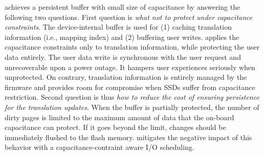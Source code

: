 \iffalse
\ours{} achieves a persistent buffer with small size of capacitance by answering the following two questions. 
First question is \textit{what not to protect under capacitance constraints}. The device-internal buffer is used for (1) caching translation information (i.e., mapping index) and (2) buffering user writes. 
\ours{} applies the capacitance constraints only to translation information, while protecting the user data entirely. The user data write is synchronous with the user request and unrecoverable upon a power outage. It hampers user experiences seriously when unprotected. On contrary, 
translation information is entirely managed by the firmware and provides room for compromise when SSDs suffer from capacitance restriction.  
Second question is thus \textit{how to reduce the cost of ensuring persistence for the translation updates}. When the buffer is partially protected, the number of dirty pages is limited to the maximum amount of data that the on-board capacitance can protect. If it goes beyond the limit, changes should be immediately flushed to the flash memory. \ours{} mitigates the negative impact of this behavior with a capacitance-contraint aware I/O scheduling.

